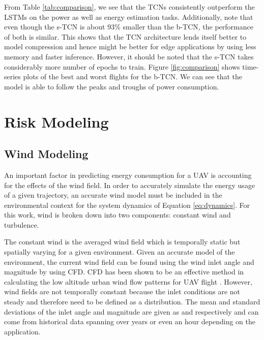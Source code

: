 \documentclass[letterpaper, 10 pt, conference]{ieeeconf}
\begin{document}
From Table \ref{tab:comparison}, we see that the TCNs consistently outperform the LSTMs on the power as well as energy estimation tasks. Additionally, note that even though the s-TCN is about 93\% smaller than the b-TCN, the performance of both is similar. This shows that the TCN architecture lends itself better to model compression and hence might be better for edge applications by using less memory and faster inference. However, it should be noted that the s-TCN takes considerably more number of epochs to train. Figure \ref{fig:comparison} shows time-series plots of the best and worst flights for the b-TCN. We can see that the model is able to follow the peaks and troughs of power consumption. 












\section{Risk Modeling}
\label{sec:risk_modeling}



\subsection{Wind Modeling}
\label{sec:wind}

An important factor in predicting energy consumption for a UAV is accounting for the effects of the wind field. In order to accurately simulate the energy usage of a given trajectory, an accurate wind model must be included in the environmental context  for the system dynamics of Equation \ref{eq:dynamics}. For this work, wind is broken down into two components: constant wind and turbulence. 



The constant wind is the averaged wind field which is temporally static but spatially varying for a given environment. Given an accurate model of the environment, the current wind field can be found using the wind inlet angle  and magnitude  by using CFD. 
CFD has been shown to be an effective method in calculating the low altitude urban wind flow patterns for UAV flight \cite{orr2005framework, ware2016analysis, galway2011modeling, pat2020}. However, wind fields are not temporally constant because the inlet conditions are not steady and therefore need to be defined as a distribution. The mean and standard deviations of the inlet angle and magnitude are given as  and  respectively and can come from historical data spanning over years or even an hour depending on the application. 
\end{document}
